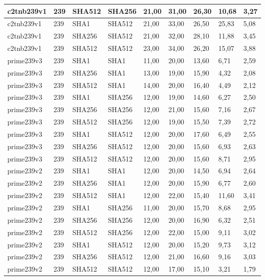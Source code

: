 \begin{longtable}{| l | l | l | l | l |l |l |l |l |}
c2tnb239v1 & 239 & SHA512 & SHA256 & 21,00 & 31,00 & 26,30 & 10,68 & 3,27 \\ \hline 
c2tnb239v1 & 239 & SHA1 & SHA512 & 21,00 & 33,00 & 26,50 & 25,83 & 5,08 \\ \hline 
c2tnb239v1 & 239 & SHA256 & SHA512 & 21,00 & 32,00 & 28,10 & 11,88 & 3,45 \\ \hline 
c2tnb239v1 & 239 & SHA512 & SHA512 & 23,00 & 34,00 & 26,20 & 15,07 & 3,88 \\ \hline 
prime239v3 & 239 & SHA1 & SHA1 & 11,00 & 20,00 & 13,60 & 6,71 & 2,59 \\ \hline 
prime239v3 & 239 & SHA256 & SHA1 & 13,00 & 19,00 & 15,90 & 4,32 & 2,08 \\ \hline 
prime239v3 & 239 & SHA512 & SHA1 & 14,00 & 20,00 & 16,40 & 4,49 & 2,12 \\ \hline 
prime239v3 & 239 & SHA1 & SHA256 & 12,00 & 19,00 & 14,60 & 6,27 & 2,50 \\ \hline 
prime239v3 & 239 & SHA256 & SHA256 & 12,00 & 21,00 & 15,60 & 7,16 & 2,67 \\ \hline 
prime239v3 & 239 & SHA512 & SHA256 & 12,00 & 19,00 & 15,50 & 7,39 & 2,72 \\ \hline 
prime239v3 & 239 & SHA1 & SHA512 & 12,00 & 20,00 & 17,60 & 6,49 & 2,55 \\ \hline 
prime239v3 & 239 & SHA256 & SHA512 & 12,00 & 20,00 & 15,60 & 6,93 & 2,63 \\ \hline 
prime239v3 & 239 & SHA512 & SHA512 & 12,00 & 20,00 & 15,60 & 8,71 & 2,95 \\ \hline 
prime239v2 & 239 & SHA1 & SHA1 & 12,00 & 20,00 & 14,50 & 6,94 & 2,64 \\ \hline 
prime239v2 & 239 & SHA256 & SHA1 & 12,00 & 20,00 & 15,90 & 6,77 & 2,60 \\ \hline 
prime239v2 & 239 & SHA512 & SHA1 & 12,00 & 22,00 & 15,40 & 11,60 & 3,41 \\ \hline 
prime239v2 & 239 & SHA1 & SHA256 & 11,00 & 20,00 & 15,70 & 8,68 & 2,95 \\ \hline 
prime239v2 & 239 & SHA256 & SHA256 & 12,00 & 20,00 & 16,90 & 6,32 & 2,51 \\ \hline 
prime239v2 & 239 & SHA512 & SHA256 & 12,00 & 22,00 & 15,00 & 9,11 & 3,02 \\ \hline 
prime239v2 & 239 & SHA1 & SHA512 & 12,00 & 20,00 & 15,20 & 9,73 & 3,12 \\ \hline 
prime239v2 & 239 & SHA256 & SHA512 & 12,00 & 21,00 & 16,60 & 9,16 & 3,03 \\ \hline 
prime239v2 & 239 & SHA512 & SHA512 & 12,00 & 17,00 & 15,10 & 3,21 & 1,79 \\ \hline 

\end{longtable}
